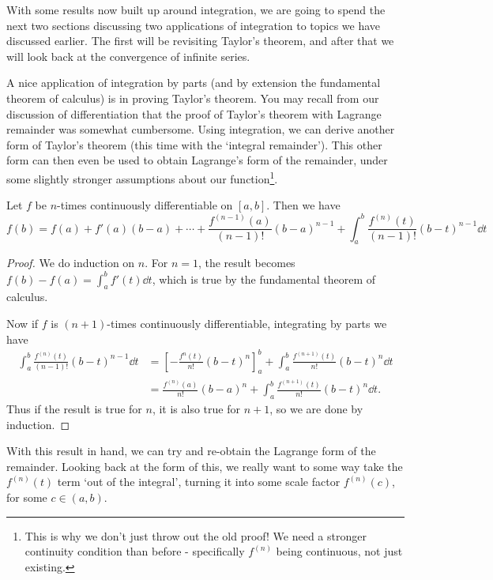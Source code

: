 \documentclass[a4paper]{scrartcl}
\begin{document}
With some results now built up around integration, we are going to spend the next two sections discussing two applications of integration to topics we have discussed earlier. The first will be revisiting Taylor's theorem, and after that we will look back at the convergence of infinite series.

A nice application of integration by parts (and by extension the fundamental theorem of calculus) is in proving Taylor's theorem.
You may recall from our discussion of differentiation that the proof of Taylor's theorem with Lagrange remainder was somewhat cumbersome. Using integration, we can derive another form of Taylor's theorem (this time with the `integral remainder'). This other form can then even be used to obtain Lagrange's form of the remainder, under some slightly stronger assumptions about our function\footnote{This is why we don't just throw out the old proof! We need a stronger continuity condition than before - specifically $f^{(n)}$ being continuous, not just existing.}.

\begin{theorem}
	Let $f$ be $n$-times continuously differentiable on $[a, b]$. Then we have
	$$
	f(b) = f(a) + f'(a)(b - a) + \cdots + \frac{f^{(n - 1)}(a)}{(n - 1)!} (b - a)^{n - 1} + \int_a^b  \frac{f^{(n)}(t)}{(n - 1)!}(b - t)^{n - 1} \dd t
	$$
\end{theorem}
\begin{proof}
	We do induction on $n$. For $n = 1$, the result becomes $f(b) - f(a) = \int_a^b f'(t) \dd t$, which is true by the fundamental theorem of calculus. 

	Now if $f$ is $(n + 1)$-times continuously differentiable, integrating by parts we have
	\begin{align*}
		\int_a^b \frac{f^{(n)}(t)}{(n - 1)!}(b - t)^{n - 1} \dd t &= \left[- \frac{f^{n}(t)}{n!}(b - t)^n\right]_a^b + \int_a^b \frac{f^{(n + 1)}(t)}{n!} (b - t)^n \dd t \\
		&= \frac{f^{(n)}(a)}{n!}(b - a)^n + \int_a^b \frac{f^{(n + 1)}(t)}{n!} (b - t)^n \dd t.
	\end{align*}
	Thus if the result is true for $n$, it is also true for $n + 1$, so we are done by induction.
\end{proof}

With this result in hand, we can try and re-obtain the Lagrange form of the remainder. Looking back at the form of this, we really want to some way take the $f^{(n)}(t)$ term `out of the integral', turning it into some scale factor $f^{(n)}(c)$, for some $c \in (a, b)$. 
\end{document}
